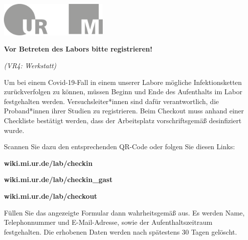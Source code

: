 \documentclass[24pt, a4paper, portrait]{article}
\begin{document}
\pagestyle{empty}

\raggedleft

\includegraphics[width=0.4\textwidth]{logo}

\vspace{1cm}
\sffamily
\centering
\huge

\textbf{Vor Betreten des Labors bitte registrieren!}

\vspace{0.5cm}
\Large
\textit{(VR4: Werkstatt)}
\vspace{0.5cm}

\raggedright

Um bei einem Covid-19-Fall in einem unserer Labore mögliche Infektionsketten zurückverfolgen zu können, müssen Beginn und Ende des Aufenthalts im Labor festgehalten werden.
Versuchsleiter*innen sind dafür verantwortlich, die Proband*innen ihrer Studien zu registrieren.
Beim Checkout muss anhand einer Checkliste bestätigt werden, dass der Arbeitsplatz vorschriftsgemäß desinfiziert wurde.

\medskip

Scannen Sie dazu den entsprechenden QR-Code oder folgen Sie diesen Links:

\textbf{wiki.mi.ur.de/lab/checkin}

\textbf{wiki.mi.ur.de/lab/checkin\_gast}

\textbf{wiki.mi.ur.de/lab/checkout}

\medskip

Füllen Sie das angezeigte Formular dann wahrheitsgemäß aus.
Es werden Name, Telephonnummer und E-Mail-Adresse, sowie der Aufenthaltszeitraum festgehalten.
Die erhobenen Daten werden nach spätestens 30 Tagen gelöscht.

\vspace{1cm}
\centering
\end{document}
